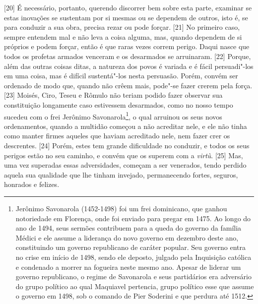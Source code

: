 {[}20{]} É necessário, portanto, querendo discorrer bem sobre esta
parte, examinar se estas inovações se sustentam por si mesmas ou se
dependem de outros, isto é, se para conduzir a sua obra, precisa rezar
ou pode forçar. {[}21{]} No primeiro caso, sempre entendem mal e não
leva a coisa alguma, mas, quando dependem de si próprios e podem forçar,
então é que raras vezes correm perigo. Daqui nasce que todos os profetas
armados venceram e os desarmados se arruinaram. {[}22{]} Porque, além
das outras coisas ditas, a natureza dos povos é variada e é fácil
persuadi"-los em uma coisa, mas é difícil sustentá"-los nesta persuasão.
Porém, convém ser ordenado de modo que, quando não crêem mais, pode"-se
fazer crerem pela força. {[}23{]} Moisés, Ciro, Teseu e Rômulo não
teriam podido fazer observar sua constituição longamente caso estivessem
desarmados, como no nosso tempo sucedeu com o frei Jerônimo
Savonarola\footnote{Jerônimo Savonarola (1452-1498) foi um frei
  dominicano, que ganhou notoriedade em Florença, onde foi enviado para
  pregar em 1475. Ao longo do ano de 1494, seus sermões contribuem para
  a queda do governo da família Médici e ele assume a liderança do novo
  governo em dezembro deste ano, constituindo um governo republicano de
  caráter popular. Seu governo entra no crise em início de 1498, sendo
  ele deposto, julgado pela Inquisição católica e condenado a morrer na
  fogueira neste mesmo ano. Apesar de liderar um governo republicano, o
  regime de Savonarola e seus partidários era adversário do grupo
  político ao qual Maquiavel pertencia, grupo político esse que assume o
  governo em 1498, sob o comando de Pier Soderini e que perdura até
  1512.}, o qual arruinou os seus novos ordenamentos, quando a multidão
começou a não acreditar nele, e ele não tinha como manter firmes aqueles
que haviam acreditado nele, nem fazer crer os descrentes. {[}24{]}
Porém, estes tem grande dificuldade no conduzir, e todos os seus perigos
estão no seu caminho, e convém que os superem com a \emph{virtù}.
{[}25{]} Mas, uma vez superadas essas adversidades, começam a ser
venerados, tendo perdido aquela sua qualidade que lhe tinham invejado,
permanecendo fortes, seguros, honrados e felizes.

